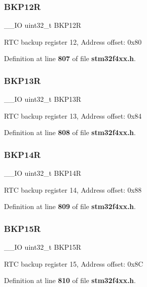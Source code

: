 \subsubsection{B\+K\+P12R}
{\footnotesize\ttfamily \+\_\+\+\_\+\+IO uint32\+\_\+t B\+K\+P12R}

R\+TC backup register 12, Address offset\+: 0x80 

Definition at line \textbf{ 807} of file \textbf{ stm32f4xx.\+h}.

\mbox{\label{structRTC__TypeDef_a6ed4c3a0d4588a75078e9f8e376b4d06}} 
\subsubsection{B\+K\+P13R}
{\footnotesize\ttfamily \+\_\+\+\_\+\+IO uint32\+\_\+t B\+K\+P13R}

R\+TC backup register 13, Address offset\+: 0x84 

Definition at line \textbf{ 808} of file \textbf{ stm32f4xx.\+h}.

\mbox{\label{structRTC__TypeDef_ac60f13e6619724747e61cfbff55b9fab}} 
\subsubsection{B\+K\+P14R}
{\footnotesize\ttfamily \+\_\+\+\_\+\+IO uint32\+\_\+t B\+K\+P14R}

R\+TC backup register 14, Address offset\+: 0x88 

Definition at line \textbf{ 809} of file \textbf{ stm32f4xx.\+h}.

\mbox{\label{structRTC__TypeDef_afafaddc3a983eb71332b7526d82191ad}} 
\subsubsection{B\+K\+P15R}
{\footnotesize\ttfamily \+\_\+\+\_\+\+IO uint32\+\_\+t B\+K\+P15R}

R\+TC backup register 15, Address offset\+: 0x8C 

Definition at line \textbf{ 810} of file \textbf{ stm32f4xx.\+h}.

